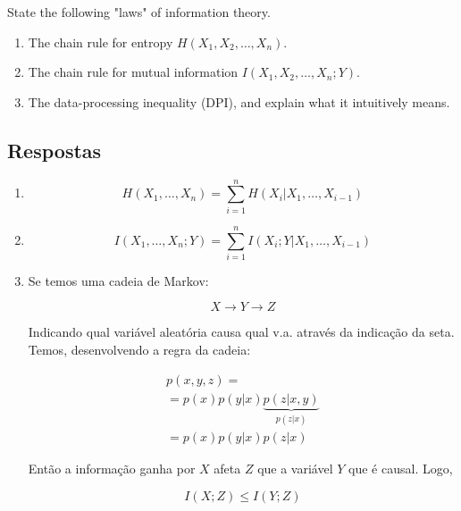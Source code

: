 State the following "laws" of information theory.

\begin{enumerate}
    \item The chain rule for entropy $H(X_1, X_2, \dots, X_n)$.
    \item The chain rule for mutual information $I(X_1, X_2, \dots, X_n; Y)$.
    \item The data-processing inequality (DPI), and explain what it intuitively means.
\end{enumerate}

\subsection*{Respostas}

\begin{enumerate}
    \item
    \[H({X_1}, \ldots ,{X_n}) = \sum\limits_{i = 1}^n {H({X_i}|{X_1}, \ldots ,{X_{i-1}})} \]
    
    \item
    \[I({X_1}, \ldots ,{X_n};Y) = \sum\limits_{i = 1}^n {I({X_i};Y|{X_1}, \ldots ,{X_{i - 1}})} \]
    
    \item
    Se temos uma cadeia de Markov:
    
    \[X \rightarrow Y \rightarrow Z\]
    
    Indicando qual variável aleatória causa qual v.a. através da indicação da seta. Temos, desenvolvendo a regra da cadeia:
    
    \[\begin{array}{l}
    \displaystyle p(x,y,z) = \\
    \displaystyle = p(x)p(y|x)\underbrace {p(z|x,y)}_{p(z|x)}\\
    \displaystyle = p(x)p(y|x)p(z|x)
    \end{array}\]
    
    Então a informação ganha por $X$ afeta $Z$ que a variável $Y$ que é causal. Logo,
    
    \[I(X; Z) \le I(Y; Z)\]
    
\end{enumerate}